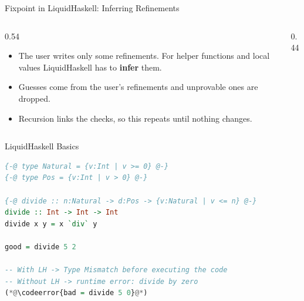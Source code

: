 \documentclass[aspectratio=169]{beamer}
\newcommand{\codeerror}[1]{%
  \begingroup
  \setlength{\fboxsep}{0pt}%
  \colorbox{themeAlert!12}{%
    \hspace{3pt}\color{themeAlert}\ttfamily\strut\detokenize{#1}\hspace{3pt}%
  }%
  \endgroup
}
\begin{document}
\begin{frame}{Fixpoint in LiquidHaskell: Inferring Refinements}
	\begin{columns}[c]
		\begin{column}{0.54\textwidth}
			\begin{itemize}
				\item The user writes only some refinements. For helper functions and local values LiquidHaskell has to \textbf{infer} them.
				\item Guesses come from the user's refinements and unprovable ones are dropped.
				\item Recursion links the checks, so this repeats until nothing changes.
			\end{itemize}
		\end{column}

		\begin{column}{0.44\textwidth}
			\centering
		\end{column}
	\end{columns}
\end{frame}

\begin{frame}[fragile]{LiquidHaskell Basics}
	\medskip
	\begin{lstlisting}[language=Haskell]
{-@ type Natural = {v:Int | v >= 0} @-}
{-@ type Pos = {v:Int | v > 0} @-}

{-@ divide :: n:Natural -> d:Pos -> {v:Natural | v <= n} @-}
divide :: Int -> Int -> Int
divide x y = x `div` y

good = divide 5 2

-- With LH -> Type Mismatch before executing the code
-- Without LH -> runtime error: divide by zero
(*@\codeerror{bad = divide 5 0}@*)
\end{lstlisting}

\end{frame}
\end{document}
